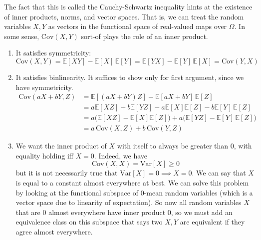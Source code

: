 \documentclass{article}
\begin{document}
      The fact that this is called the Cauchy-Schwartz inequality hints at the existence of inner products, norms, and vector spaces. That is, we can treat the random variables $X, Y$ as vectors in the functional space of real-valued maps over $\Omega$. In some sense, $\mathrm{Cov}(X, Y)$ sort-of plays the role of an inner product. 
      \begin{enumerate}
        \item It satisfies symmetricity: 
        \begin{equation}
          \mathrm{Cov}(X, Y) = \mathbb{E}[X Y] - \mathbb{E}[X] \, \mathbb{E}[Y] =  \mathbb{E}[Y X] - \mathbb{E}[Y] \, \mathbb{E}[X] = \mathrm{Cov}(Y, X)
        \end{equation}
        
        \item It satisfies binlinearity. It suffices to show only for first argument, since we have symmetricity. 
        \begin{align*}
          \mathrm{Cov}(aX + bY, Z) & = \mathbb{E}[(a X + b Y) Z] - \mathbb{E}[a X + b Y] \, \mathbb{E}[Z] \\
          & = a \mathbb{E}[X Z] + b \mathbb{E}[Y Z] - a \mathbb{E}[X] \mathbb{E}[Z] - b \mathbb{E}[Y] \, \mathbb{E}[Z] \\
          & = a \big( \mathbb{E}[X Z] - \mathbb{E}[X] \mathbb{E}[Z] \big) + a \big( \mathbb{E}[Y Z] - \mathbb{E}[Y] \, \mathbb{E}[Z] \big) \\
          & = a \, \mathrm{Cov}(X, Z) + b \, \mathrm{Cov}(Y, Z)
        \end{align*}

        \item We want the inner product of $X$ with itself to always be greater than $0$, with equality holding iff $X = 0$. Indeed, we have 
        \begin{equation}
          \mathrm{Cov}(X, X) = \mathrm{Var}[X] \geq 0
        \end{equation}
        but it is not necessarily true that $\mathrm{Var}[X] = 0 \implies X = 0$. We can say that $X$ is equal to a constant almost everywhere at best. We can solve this problem by looking at the functional subspace of $0$-mean random variables (which is a vector space due to linearity of expectation). So now all random variables $X$ that are $0$ almost everywhere have inner product $0$, so we must add an equivalence class on this subspace that says two $X, Y$ are equivalent if they agree almost everywhere. 
      \end{enumerate}
\end{document}
